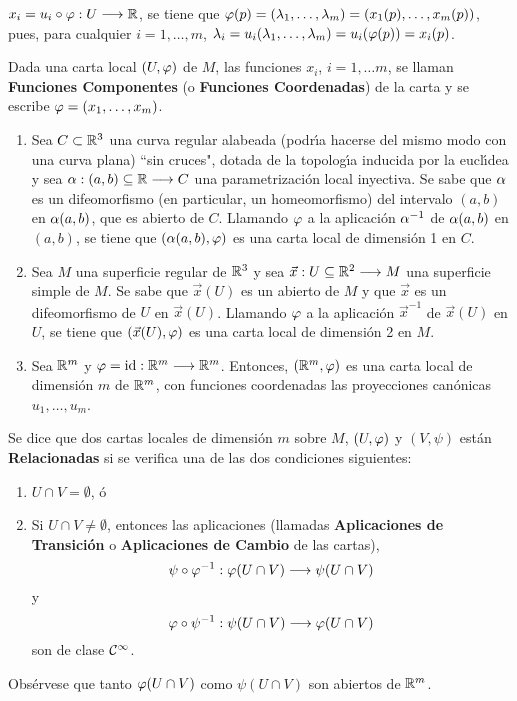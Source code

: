 \documentclass[cursovd_portada.tex]{subfiles}
\begin{document}
$x_i=u_i\circ\varphi:U\longrightarrow\mathbb{R}$, se tiene que $\varphi(p)=(\lambda_1,\dots
,\lambda_m)=(x_1(p),\dots ,x_m(p))$, pues, para cualquier
$i=1,\dots ,m$, $\lambda_i=u_i(\lambda_1,\dots
,\lambda_m)=u_i(\varphi(p))=x_i(p)$.
\begin{defi}
Dada una carta local $(U,\varphi)$ de $M$, las funciones $x_i$,
$i=1,\dots m$, se llaman {\bf Funciones Componentes} (o {\bf
Funciones Coordenadas}) de la carta y se escribe $\varphi=(x_1,\dots
,x_m)$.
\end{defi}
\begin{ej}
{\rm
\begin{enumerate}
\item Sea $C\subset\mathbb{R}^3$ una curva regular alabeada (podr\'{\i}a
hacerse del mismo modo con una curva plana) ``sin cruces", dotada
de la topolog\'{\i}a inducida por la eucl\'{\i}dea y sea
$\alpha:(a,b)\subseteq\mathbb{R}\longrightarrow C$ una parametrizaci\'{o}n local
inyectiva. Se sabe que $\alpha$ es un difeomorfismo (en particular, un
homeo\-mor\-fis\-mo) del intervalo $(a,b)$ en $\alpha(a,b)$, que es
abierto de $C$. Llamando $\varphi$ a la aplicaci\'{o}n $\alpha^{-1}$ de
$\alpha(a,b)$ en $(a,b)$, se tiene que $(\alpha(a,b),\varphi)$ es una carta
local de dimensi\'{o}n 1 en $C$. \item Sea $M$ una superficie
regular de $\mathbb{R}^3$ y sea $\vec{x}:U\subseteq\mathbb{R}^2\longrightarrow M$ una
superficie simple de $M$. Se sabe que $\vec{x}(U)$ es un abierto
de $M$ y que $\vec{x}$ es un difeomorfismo de $U$ en $\vec{x}(U)$.
Llamando $\varphi$ a la aplicaci\'{o}n $\vec{x}^{-1}$ de $\vec{x}(U)$
en $U$, se tiene que $(\vec{x}(U),\varphi)$ es una carta local de
dimensi\'{o}n 2 en $M$. \item Sea $\mathbb{R}^m$ y $\varphi={\rm
id}:\mathbb{R}^m\longrightarrow\mathbb{R}^m$. Entonces, $(\mathbb{R}^m,\varphi)$ es una carta local de
dimensi\'{o}n $m$ de $\mathbb{R}^m$, con funciones coordenadas las
proyecciones can\'{o}nicas $u_1,\dots ,u_m$.
\end{enumerate}}
\end{ej}
\begin{defi} Se dice que dos cartas locales de dimensi\'{o}n $m$ sobre $M$, $(U,\varphi)$ y $(V,\psi)$ est\'{a}n {\bf
Relacionadas} si se verifica una de las dos condiciones siguientes:
\begin{enumerate}
\item $U\cap V=\emptyset$, \'{o}
\item Si $U\cap V\neq\emptyset$, entonces las aplicaciones (llamadas {\bf Aplicaciones de Transici\'{o}n} o {\bf Aplicaciones
de Cambio} de las cartas),
$$\psi\circ\varphi^{-1}:\varphi(U\cap V)\longrightarrow\psi(U\cap V)$$
y
$$\varphi\circ\psi^{-1}:\psi(U\cap V)\longrightarrow\varphi(U\cap V)$$
son de clase ${\cal C}^{\infty}$.
\end{enumerate}
\hs Obs\'{e}rvese que tanto $\varphi(U\cap V)$ como $\psi(U\cap V)$ son abiertos de $\mathbb{R}^m$.
\end{defi}
\end{document}
